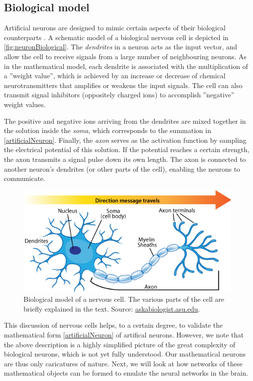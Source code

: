 \documentclass[twoside,english]{uiofysmaster}
\begin{document}
\subsection*{Biological model}
Artificial neurons are designed to mimic certain aspects of their biological counterparts \cite{Kriesel07}. 
A schematic model of a biological nervous cell is depicted in \autoref{fig:neuronBiological}.
The \textit{dendrites} in a neuron acts as the input vector, and allow the cell to receive signals from a large number
of neighbouring neurons. As in the mathematical model, each dendrite is associated with the multiplication of a
''weight value'', which is achieved by an increase or decrease of chemical neurotransmitters that amplifies or
weakens the input signals. The cell can also transmit signal inhibitors (oppositely charged ions) to 
accomplish ''negative'' weight values. 

The positive and negative ions arriving from the dendrites are mixed together in the solution inside the \textit{soma}, 
which corresponds to the summation in \eqref{artificialNeuron}. Finally, the \textit{axon} serves
as the activation function by sampling the electrical potential of this solution. If the potential 
reaches a certain strength, the axon transmits a signal pulse down its own length. The axon is connected 
to another neuron's dendrites (or other parts of the cell), enabling the neurons to communicate. 
\begin{figure}
 \centering
  \includegraphics[width=0.9\linewidth]{Figures/Theory/neuron_anatomy.jpg}
  \caption{Biological model of a nervous cell. The various parts of the cell are briefly explained in the text. 
	   Source: \href{https://askabiologist.asu.edu/neuron-anatomy}{askabiologist.asu.edu}.}
  \label{fig:neuronBiological}
\end{figure}

This discussion of nervous cells helps, to a certain degree, to validate the mathematical form \eqref{artificialNeuron}
of artifical neurons. However, we note that the above description is a highly simplified picture of the great complexity
of biological neurons, which is not yet fully understood. Our mathematical neurons are thus only caricatures of nature. 
Next, we will look at how networks of these mathematical objects can be formed to emulate the neural networks
in the brain.
\end{document}
